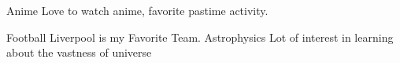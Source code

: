 



\begin{cvskills}
  \cvskill
    {Anime} %
    {Love to watch anime, favorite pastime activity.} %

  
  \cvskill
    {Football} %
    {Liverpool is my Favorite Team.}
  \cvskill
    {Astrophysics} %
    {Lot of interest in learning about the vastness of universe} %


\end{cvskills}